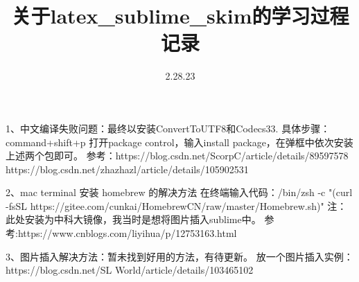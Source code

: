 \documentclass{article}
\begin{document}
\date{2.28.23}
\title{关于latex_sublime_skim的学习过程记录}


1、中文编译失败问题：最终以安装ConvertToUTF8和Codecs33.
   具体步骤：command+shift+p 打开package control，输入install package，在弹框中依次安装上述两个包即可。
   参考：https://blog.csdn.net/ScorpC/article/details/89597578
        https://blog.csdn.net/zhazhazl/article/details/105902531

2、mac terminal 安装 homebrew 的解决方法
   在终端输入代码：/bin/zsh -c "(curl -fsSL https://gitee.com/cunkai/HomebrewCN/raw/master/Homebrew.sh)"
   注：此处安装为中科大镜像，我当时是想将图片插入sublime中。
   参考:https://www.cnblogs.com/liyihua/p/12753163.html

3、图片插入解决方法：暂未找到好用的方法，有待更新。
   放一个图片插入实例：https://blog.csdn.net/SL World/article/details/103465102
\end{document}
